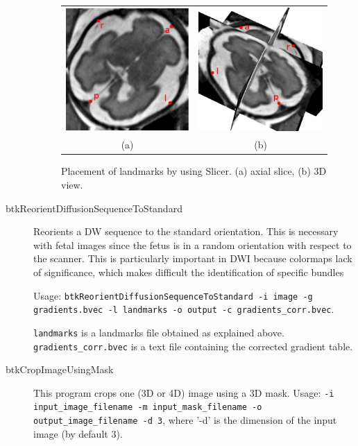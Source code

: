 \begin{description}
\begin{figure}[t]
\centering
\begin{tabular}{cc}
\includegraphics[width=0.35\columnwidth]{lmks_axial.eps}&
\includegraphics[width=0.35\columnwidth]{lmks_3D.eps}\\
{(a)}&{(b)}\\
\end{tabular}
\caption{Placement of landmarks by using Slicer. (a) axial slice, (b) 3D view.}
\label{fig:landmarks}
\end{figure}

  \item[btkReorientDiffusionSequenceToStandard] Reorients a DW sequence
to the standard orientation. This is necessary with fetal images since the fetus
is in a random orientation with respect to the scanner. This is particularly
important in DWI because colormaps lack of significance, which makes difficult
the identification of specific bundles 

Usage: \texttt{btkReorientDiffusionSequenceToStandard -i image -g
gradients.bvec -l landmarks -o output -c gradients\_corr.bvec}.

\texttt{landmarks} is a landmarks file obtained as explained above.
\texttt{gradients\_corr.bvec} is a text file containing the corrected
gradient table.

\item[btkCropImageUsingMask] This program crops one (3D or 4D) image using a 3D mask. Usage: \texttt{-i input\_image\_filename -m
input\_mask\_filename -o output\_image\_filename -d 3}, where '-d' is the dimension of the input image (by default 3).


\end{description}
